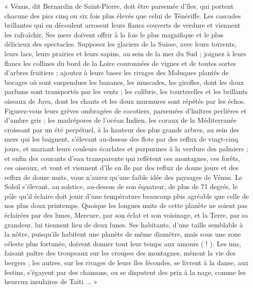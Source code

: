 \documentclass[a4paper, 11pt, oneside]{article}
\begin{document}
« Vénus, dit Bernardin de Saint-Pierre, doit être parsemée d'îles, qui portent chacune des pics cinq ou six fois plus élevés que celui de Ténériffe. Les cascades brillantes qui en découlent arrosent leurs flancs couverts de verdure et viennent les rafraîchir. Ses mers doivent offrir à la fois le plus magnifique et le plus délicieux des spectacles. Supposez les glaciers de la Suisse, avec leurs torrents, leurs lacs, leurs prairies et leurs sapins, au sein de la mer du Sud ; joignez à leurs flancs les collines du bord de la Loire couronnées de vignes et de toutes sortes d'arbres fruitiers ; ajoutez à leurs bases les rivages des Moluques plantés de bocages où sont suspendues les bananes, les muscades, les girofles, dont les doux parfums sont transportés par les vents ; les colibris, les tourterelles et les brillants oiseaux de Java, dont les chants et les doux murmures sont répétés par les échos. Figurez-vous leurs grèves ombragées de cocotiers, parsemées d'huîtres perlières et d'ambre gris ; les madrépores de l'océan Indien, les coraux de la Méditerranée croissant par un été perpétuel, à la hauteur des plus grands arbres, au sein des mers qui les baignent, s'élevant au-dessus des flots par des reflux de vingt-cinq jours, et mariant leurs couleurs écarlates et purpurines à la verdure des palmiers ; et enfin des courants d'eau transparente qui reflètent ces montagnes, ces forêts, ces oiseaux, et vont et viennent d'île en île par des reflux de douze jours et des reflux de douze nuits, vous n'aurez qu'une faible idée des paysages de Vénus. Le Soleil s'élevant, au solstice, au-dessus de son équateur, de plus de 71 degrés, le pôle qu'il éclaire doit jouir d'une température beaucoup plus agréable que celle de nos plus doux printemps. Quoique les longues nuits de cette planète ne soient pas éclairées par des lunes, Mercure, par son éclat et son voisinage, et la Terre, par sa grandeur, lui tiennent lieu de deux lunes. Ses habitants, d'une taille semblable à la nôtre, puisqu'ils habitent une planète de même diamètre, mais sous une zone céleste plus fortunée, doivent donner tout leur temps aux amours ( ! ). Les uns, faisant paître des troupeaux sur les croupes des montagnes, mènent la vie des bergers ; les autres, sur les rivages de leurs îles fécondes, se livrent à la danse, aux festins, s'égayent par des chansons, ou se disputent des prix à la nage, comme les heureux insulaires de Taïti ... »
\end{document}
